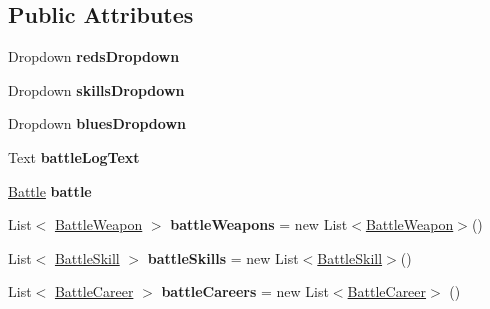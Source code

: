 \subsection*{Public Attributes}
\begin{DoxyCompactItemize}
\item 
Dropdown {\bfseries reds\+Dropdown}\hypertarget{class_battle_manager_a3ad4d83d7c4d871ba5398191d29e78c2}{}\label{class_battle_manager_a3ad4d83d7c4d871ba5398191d29e78c2}

\item 
Dropdown {\bfseries skills\+Dropdown}\hypertarget{class_battle_manager_a359adfc5ad5822a356872f15811e8372}{}\label{class_battle_manager_a359adfc5ad5822a356872f15811e8372}

\item 
Dropdown {\bfseries blues\+Dropdown}\hypertarget{class_battle_manager_ac8bf889864223da430287b02a5459535}{}\label{class_battle_manager_ac8bf889864223da430287b02a5459535}

\item 
Text {\bfseries battle\+Log\+Text}\hypertarget{class_battle_manager_afd9fdee7546beba1587665856ae07921}{}\label{class_battle_manager_afd9fdee7546beba1587665856ae07921}

\item 
\hyperlink{class_battle}{Battle} {\bfseries battle}\hypertarget{class_battle_manager_a2fcdbf31de8ee8c4bf85bdcc604b8702}{}\label{class_battle_manager_a2fcdbf31de8ee8c4bf85bdcc604b8702}

\item 
List$<$ \hyperlink{class_battle_weapon}{Battle\+Weapon} $>$ {\bfseries battle\+Weapons} = new List$<$\hyperlink{class_battle_weapon}{Battle\+Weapon}$>$()\hypertarget{class_battle_manager_a0b6e2414662d80bd00547a6fdf829f76}{}\label{class_battle_manager_a0b6e2414662d80bd00547a6fdf829f76}

\item 
List$<$ \hyperlink{class_battle_skill}{Battle\+Skill} $>$ {\bfseries battle\+Skills} = new List$<$\hyperlink{class_battle_skill}{Battle\+Skill}$>$()\hypertarget{class_battle_manager_a3c558b96782be650386dd2c22728a007}{}\label{class_battle_manager_a3c558b96782be650386dd2c22728a007}

\item 
List$<$ \hyperlink{class_battle_career}{Battle\+Career} $>$ {\bfseries battle\+Careers} = new List$<$\hyperlink{class_battle_career}{Battle\+Career}$>$ ()\hypertarget{class_battle_manager_a88ccff021cd01968036154df9b59a958}{}\label{class_battle_manager_a88ccff021cd01968036154df9b59a958}


\end{DoxyCompactItemize}
